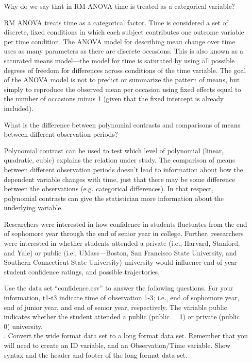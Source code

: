 \documentclass[onecolumn,10pt]{jhwhw}
\begin{document}
\problem{}
Why do we say that in RM ANOVA time is treated as a categorical variable?

RM ANOVA treats time as a categorical factor. Time is considered a set of discrete, fixed conditions in which each subject contributes one outcome variable per time condition. The ANOVA model for describing mean change over time uses as many parameters as there are discrete occasions. This is also known as a saturated means model---the model for time is saturated by using all possible degrees of freedom for differences across conditions of the time variable. The goal of the ANOVA model is not to predict or summarize the pattern of means, but simply to reproduce the observed mean per occasion using fixed effects equal to the number of occasions minus 1 (given that the fixed intercept is already included).

\problem{}
What is the difference between polynomial contrasts and comparisons of means between different observation periods?

Polynomial contrast can be used to test which level of polynomial (linear, quadratic, cubic) explains the relation under study. The comparison of means between different observation periods doesn't lead to information about how the dependent variable changes with time, just that there may be some difference between the observations (e.g. categorical differences). In that respect, polynomial contrasts can give the statistician more information about the underlying variable.

\problem{}
Researchers were interested in how confidence in students fluctuates from the end of sophomore year through the end of senior year in college. Further, researchers were interested in whether students attended a private (i.e., Harvard, Stanford, and Yale) or public (i.e., UMass---Boston, San Francisco State University, and Southern Connecticut State University) university would influence end-of-year student confidence ratings, and possible trajectories.

Use the data set “confidence.csv” to answer the following questions. For your information, t1-t3 indicate time of observation 1-3; i.e., end of sophomore year, end of junior year, and end of senior year, respectively. The variable public indicates whether the student attended a public (public = 1) or private (public = 0) university.\\

. Convert the wide format data set to a long format data set. Remember that you will need to create an ID variable, and an Observation/Time variable. Show syntax and the header and footer of the long format data set.\\
\end{document}
